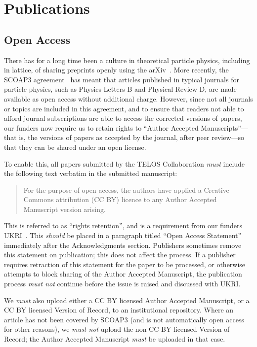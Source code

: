 \documentclass{article}
\newcommand\rfcword[1]{\emph{#1}\xspace}
\newcommand\must{\rfcword{must}}
\newcommand\mustnot{\rfcword{must not}}
\newcommand\should{\rfcword{should}}
\begin{document}
\section{Publications}
\label{sec:publications}

\subsection{Open Access}

There has for a long time been a culture in theoretical particle physics,
including in lattice,
of sharing preprints openly using the arXiv~\cite{ginsparg2021lessons}.
More recently,
the SCOAP3 agreement~\cite{scoap3} has meant that
articles published in
typical journals for particle physics,
such as Physics Letters B and Physical Review D,
are made available as open access without additional charge.
However,
since not all journals or topics are included in this agreement,
and to ensure
that readers not able to afford journal subscriptions
are able to access the corrected versions of papers,
our funders now require us to retain rights to
``Author Accepted Manuscripts''---that is,
the versions of papers as accepted by the journal,
after peer review---so
that they can be shared under an open license.

To enable this,
all papers submitted by the TELOS Collaboration
\must include the following text verbatim in the submitted manuscript:

\begin{quote}
  For the purpose of open access,
  the authors have applied a Creative Commons attribution (CC BY) licence
  to any Author Accepted Manuscript version arising.
\end{quote}

This is referred to as ``rights retention'',
and is a requirement from our funders UKRI~\cite{ukri-openaccess}.
This \should be placed in a paragraph titled
``Open Access Statement''
immediately after the Acknowledgments section.
Publishers sometimes remove this statement on publication;
this does not affect the process.
If a publisher requires retraction of this statement for the paper to be processed,
or otherwise attempts to block sharing of the Author Accepted Manuscript,
the publication process \mustnot continue
before the issue is raised and discussed with UKRI\@.

We \must also upload either a CC BY licensed Author Accepted Manuscript,
or a CC BY licensed Version of Record,
to an institutional repository.
Where an article has not been covered by SCOAP3
(and is not automatically open access for other reasons),
we \mustnot upload the non-CC BY licensed Version of Record;
the Author Accepted Manuscript \must be uploaded in that case.
\end{document}
